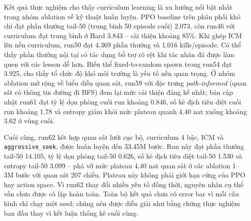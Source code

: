 Kết quả thực nghiệm cho thấy curriculum learning là xu hướng nổi bật nhất trong nhóm ablation về kỹ thuật huấn luyện. PPO baseline trên phân phối khó chỉ đạt phần thưởng tail-50 (trung bình 50 episode cuối) 2.073, còn run46 với curriculum đạt trung bình ở Hard 3.843 -- cải thiện khoảng 85\%. Khi ghép ICM lên nền curriculum, run50 đạt 4.369 phần thưởng và 1.016 kills/episode. Có thể thấy phần thưởng nội tại có tác dụng bổ trợ rõ rệt khi tác nhân đã được làm quen với các lesson dễ hơn. Biến thể fixed-to-random spawn trong run54 đạt 3.925, cho thấy tổ chức độ khó môi trường là yếu tố nền quan trọng. Ở nhóm ablation mở rộng về biểu diễn quan sát, run59 với đặc trưng \emph{path-informed} (quan sát có thông tin đường đi BFS) đem lại mức cải thiện đáng kể nhất; bản cập nhật run61 đạt tỷ lệ dọn phòng cuối run khoảng 0.846, số kẻ địch tiêu diệt cuối run khoảng 1.78 và entropy giảm khỏi mức plateau quanh 4.40 nat xuống khoảng 3.62 ở vùng cuối.

Cuối cùng, run62 kết hợp quan sát lưới cục bộ, curriculum 4 bậc, ICM và \texttt{aggressive\_seek}, được huấn luyện đến 33.45M bước. Run này đạt phần thưởng tail-50 14.105, tỷ lệ dọn phòng tail-50 0.626, số kẻ địch tiêu diệt tail-50 1.530 và entropy tail-50 3.099 -- phá vỡ mức plateau 4.40 nat quan sát ở các ablation 1--3M bước với quan sát 207 chiều. Plateau này không phải giới hạn cứng của PPO hay action space. Vì run62 thay đổi nhiều yếu tố đồng thời, nguyên nhân cụ thể vẫn chưa được cô lập hoàn toàn. Toàn bộ kết quả chưa có error bar vì mỗi cấu hình chỉ chạy một seed; chúng nên được diễn giải như bằng chứng thực nghiệm ban đầu thay vì kết luận thống kê cuối cùng.

